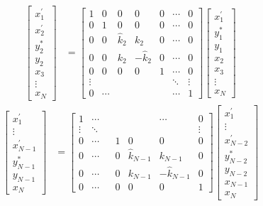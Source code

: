 \documentclass[a4paper,twoside,10pt,english]{report}
\begin{document}
\begin{align*}
\left[\begin{array}{c}
x_{1}^{\prime}\\
x_{2}^{\prime}\\
y_{2}^{*}\\
y_{2}\\
x_{3}\\
\vdots\\
x_{N}
\end{array}\right] & = \left[\begin{array}{ccccccc}
1 & 0 & 0 & 0 & 0 & \cdots & 0\\
0 & 1 & 0 & 0 & 0 & \cdots & 0\\
0 & 0 & \hat{k}_{2} & k_{2} & 0 &\cdots & 0\\
0 & 0 & k_{2} & -\hat{k}_{2} & 0 &\cdots & 0\\
0 & 0 & 0 & 0 & 1 & \cdots & 0\\
\vdots &  & & &  & \ddots & \vdots\\
0 & \cdots &  & & & \cdots & 1
\end{array}\right]\left[\begin{array}{c}
x_{1}^{\prime} \\
y_{1}^{*}\\
y_{1}\\
x_{2}\\
x_{3}\\
\vdots\\
x_{N}
\end{array}\right]
\end{align*}
\begin{align*}
\left[\begin{array}{c}
x_{1}^{\prime}\\
\vdots\\
x_{N-1}^{\prime}\\
y_{N-1}^{*}\\
y_{N-1}\\
x_{N}
\end{array}\right] & = \left[\begin{array}{ccccccc}
1 & \cdots & & & & \cdots & 0\\
\vdots & \ddots & & & & & \vdots\\
0 & \cdots & & 1 & 0 & 0 & 0\\
0 & \cdots & & 0 & \hat{k}_{N-1} & k_{N-1} & 0\\
0 & \cdots & & 0 & k_{N-1} & -\hat{k}_{N-1} & 0\\
0 & \cdots & & 0 & 0 & 0 & 1
\end{array}\right]\left[\begin{array}{c}
x_{1}^{\prime}\\
\vdots\\
x_{N-2}^{\prime}\\
y_{N-2}^{*}\\
y_{N-2}\\
x_{N-1}\\
x_{N}
\end{array}\right]
\end{align*}
\end{document}
